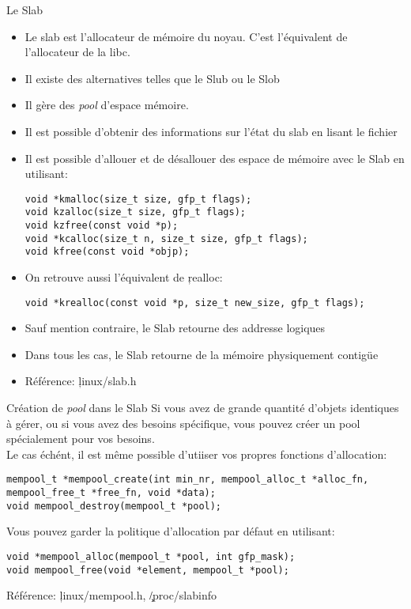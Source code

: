 \begin{frame}[fragile=singleslide]{Le Slab}
  \begin{itemize} 
  \item  Le   slab  est  l'allocateur  de  mémoire   du  noyau.  C'est
    l'équivalent de l'allocateur de la libc.
  \item Il existe des alternatives telles que le Slub ou le Slob
  \item Il gère des \emph{pool} d'espace mémoire. 
  \item Il est possible d'obtenir  des informations sur l'état du slab
    en lisant le fichier 
  \item  Il est  possible d'allouer  et  de désallouer  des espace  de
    mémoire avec le Slab en utilisant:
    \begin{lstlisting} 
void *kmalloc(size_t size, gfp_t flags);
void kzalloc(size_t size, gfp_t flags);
void kzfree(const void *p);
void *kcalloc(size_t n, size_t size, gfp_t flags);
void kfree(const void *objp);
    \end{lstlisting} 
  \item On retrouve aussi l'équivalent de \c{realloc}:
    \begin{lstlisting} 
void *krealloc(const void *p, size_t new_size, gfp_t flags);
    \end{lstlisting} 
  \item Sauf mention contraire, le Slab retourne des addresse logiques
  \item Dans tous les cas, le Slab retourne de la mémoire physiquement
    contigüe
  \item Référence: \c{linux/slab.h}
  \end{itemize} 
\end{frame} 

\begin{frame}[fragile=singleslide]{Création de \emph{pool} dans le Slab}
  Si vous avez  de grande quantité d'objets identiques  à gérer, ou si
  vous avez des besoins spécifique, vous pouvez créer un pool
  spécialement pour vos besoins.\\[2ex]

  Le cas échént, il est  même possible d'utiiser vos propres fonctions
  d'allocation:
  \begin{lstlisting} 
mempool_t *mempool_create(int min_nr, mempool_alloc_t *alloc_fn, mempool_free_t *free_fn, void *data);
void mempool_destroy(mempool_t *pool);
  \end{lstlisting} 
  Vous pouvez garder la politique d'allocation par défaut en
  utilisant:
  \begin{lstlisting} 
void *mempool_alloc(mempool_t *pool, int gfp_mask);
void mempool_free(void *element, mempool_t *pool);
  \end{lstlisting} 
  Référence: \c{linux/mempool.h}, \c{/proc/slabinfo}
\end{frame}

